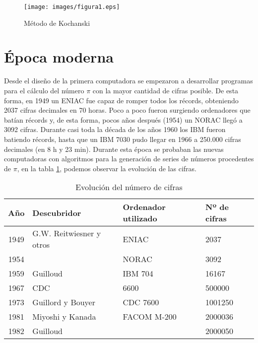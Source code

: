 \documentclass[spanish,a4paper,11pt]{article}
\begin{document}
\begin{figure}[!th]
\begin{center}
\texttt{[image: images/figura1.eps]}
\caption{Método de Kochanski}
\label{Kochanski}
\end{center}
\end{figure}


\section{Época moderna}
Desde el diseño de la primera computadora se empezaron a desarrollar programas para el cálculo del número $\pi$ con la mayor cantidad de cifras
posible. De esta forma, en 1949 un ENIAC fue capaz de romper todos los récords, obteniendo 2037 cifras decimales en 70 horas. Poco a poco fueron
surgiendo ordenadores que batían récords y, de esta forma, pocos años después (1954) un NORAC llegó a 3092 cifras. Durante casi toda la década
de los años 1960 los IBM fueron batiendo récords, hasta que un IBM 7030 pudo llegar en 1966 a 250.000 cifras decimales (en 8 h y 23 min).
Durante esta época se probaban las nuevas computadoras con algoritmos para la generación de series de números procedentes de $\pi$, en la tabla \ref{tiempo},
podemos observar la evolución de las cifras.

\begin{table}[!ht]
\begin{center}
\begin{tabular}{|c|l|l|l|}
\hline
Año & Descubridor & Ordenador utilizado & Nº de cifras \\ \hline
1949 & G.W. Reitwiesner y otros & ENIAC & 2037 \\ \hline
1954 & & NORAC & 3092 \\ \hline
1959 & Guilloud & IBM 704 & 16167 \\ \hline
1967 & CDC & 6600 & 500000 \\ \hline
1973 & Guillord y Bouyer & CDC 7600 & 1001250 \\ \hline
1981 & Miyoshi y Kanada & FACOM M-200 & 2000036 \\ \hline
1982 & Guilloud & &	2000050 \\ \hline
\end{tabular}
\end{center}
\caption{Evolución del número de cifras}
\label{tiempo}
\end{table}
















\end{document}
